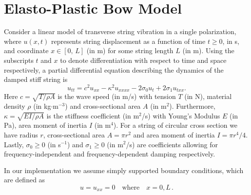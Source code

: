 \documentclass[twoside,a4paper,dvipsnames]{article}
\def\SWcomment[#1]{\textcolor{Green}{#1}}
\begin{document}
\section{Elasto-Plastic Bow Model}\label{sec:elasto}

Consider a linear model of transverse string vibration in a single polarization, where $u(x,t)$ represents string displacement as a function of time $t\geq 0$, in s, and coordinate $x\in[0,\,L]$ (in m) for some string length $L$ (in m). Using the subscripts $t$ and $x$ to denote differentiation with respect to time and space respectively, a partial differential equation describing the dynamics of the damped stiff string is \cite{Bilbao2009}
\begin{equation}\label{eq:PDE}
    u_{tt} = c^2u_{xx}-\kappa^2u_{xxxx}-2\sigma_0u_t+2\sigma_1u_{txx}.
\end{equation}
Here $c = \sqrt{T/\rho A}$ is the wave speed (in m/s) with tension $T$ (in N), material density $\rho$ (in kg$\cdot$m$^{-3}$) and cross-sectional area $A$ (in m$^2$). Furthermore, $\kappa = \sqrt{EI/\rho A}$ is the stiffness coefficient (in m$^2$/s) with Young's Modulus $E$ (in Pa), area moment of inertia $I$ (in m$^4$). For a string of circular cross section we have radius $r$, cross-sectional area $A=\pi r^2$ and area moment of inertia $I=\pi r^4 /4$.  Lastly, $\sigma_0 \geq 0$ (in s$^{-1}$) and $\sigma_1 \geq 0$ (in m$^2$/s) 
are coefficients allowing for frequency-independent and frequency-dependent damping respectively. 

In our implementation we assume simply supported boundary conditions, which are defined as
\begin{equation}
    u = u_{xx} = 0 \quad \text{where} \quad x = 0, L\, .
\end{equation}
\end{document}
